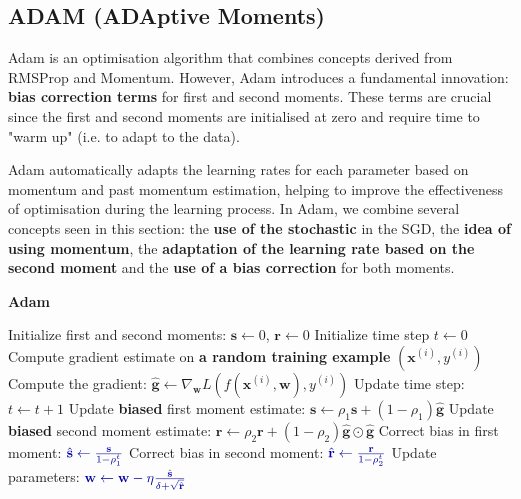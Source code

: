 \subsection{ADAM (ADAptive Moments)}
Adam is an optimisation algorithm that combines concepts derived from RMSProp and Momentum.  However, Adam introduces a fundamental innovation: \textbf{bias correction terms} for first and second moments. These terms are crucial since the first and second moments are initialised at zero and require time to "warm up" (i.e. to adapt to the data).

Adam automatically adapts the learning rates for each parameter based on momentum and past momentum estimation, helping to improve the effectiveness of optimisation during the learning process. In Adam, we combine several concepts seen in this section: the \textbf{use of the stochastic} in the SGD, the \textbf{idea of using momentum}, the \textbf{adaptation of the learning rate based on the second moment} and the \textbf{use of a bias correction} for both moments.
\newpage
\begin{algorithm}
\renewcommand\thealgorithm{}
\caption{\textbf{\textcolor{mygreen}{Adam}}}
\begin{algorithmic}[1]
\STATE Initialize first and second moments: $\mathbf{s} \leftarrow 0$, $\mathbf{r} \leftarrow 0$
\STATE Initialize time step $t \leftarrow 0$
\STATE Compute gradient estimate on \textbf{\textcolor{myred}{a random training example}} $(\mathbf{x}^{(i)}, y^{(i)})$
\STATE Compute the gradient: $\mathbf{\hat{g}} \leftarrow \nabla_{\mathbf{w}} L(f(\mathbf{x}^{(i)},\mathbf{w}), y^{(i)})$
\STATE Update time step: $t \leftarrow t + 1$
\STATE Update \textbf{biased} first moment estimate:
$\mathbf{s} \leftarrow \rho_1 \mathbf{s} + (1 - \rho_1) \mathbf{\hat{g}}$ \qquad \quad \qquad \COMMENT{\textbf{\textcolor{gray!90!white}{Momentum Idea}}}
\STATE Update \textbf{biased} second moment estimate:
$\mathbf{r} \leftarrow \rho_2 \mathbf{r} + (1 - \rho_2) \mathbf{\hat{g}} \odot \mathbf{\hat{g}}$ \qquad \COMMENT{\textbf{\textcolor{gray!90!white}{RMSProp Idea}}}
\STATE Correct bias in first moment: $\textcolor{mybluee}{\hat{\mathbf{s}} \leftarrow \frac{\mathbf{s}}{1 - \rho_1^t}}$
\STATE Correct bias in second moment: $\textcolor{mybluee}{\hat{\mathbf{r}} \leftarrow \frac{\mathbf{r}}{1 - \rho_2^t}}$
\STATE Update parameters:
$\textcolor{mybluee}{\mathbf{w} \leftarrow \mathbf{w} - \eta \frac{\hat{\mathbf{s}}}{\delta + \sqrt{\hat{\mathbf{r}}}}}$
\ENDWHILE
\end{algorithmic}
\end{algorithm}

